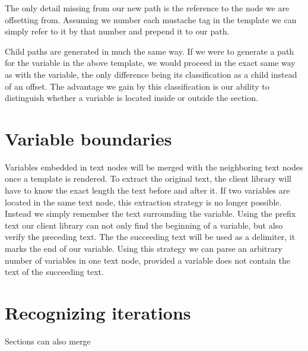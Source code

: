 The only detail missing from our new path is the reference to the node we are
offsetting from. Assuming we number each mustache tag in the template we can
simply refer to it by that number and prepend it to our path.

Child paths are generated in much the same way. If we were to generate a path
for the  variable in the above template, we would
proceed in the exact same way as with the  variable,
the only difference being its classification as a child instead of an offset.
The advantage we gain by this classification is our ability to distinguish
whether a variable is located inside or outside the section.

\section{Variable boundaries}
Variables embedded in text nodes will be merged with the neighboring text nodes
once a template is rendered. To extract the original text, the client library
will have to know the exact length the text before and after it. If two
variables are located in the same text node, this extraction strategy is no
longer possible. Instead we simply remember the text surrounding the variable.
Using the prefix text our client library can not only find the beginning of a
variable, but also verify the preceding text. The the succeeding text will be
used as a delimiter, it marks the end of our variable.
Using this strategy we can parse an arbitrary number of variables in one text
node, provided a variable does not contain the text of the succeeding text.

\section{Recognizing iterations}
Sections can also merge












